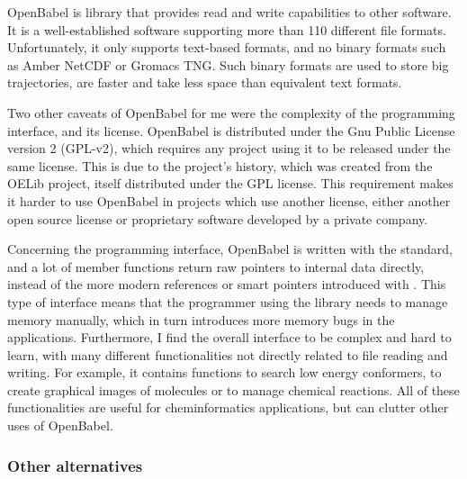 \documentclass[thesis]{subfiles}
\begin{document}
OpenBabel\cite{OBoyle2011} is \cxx library that provides read and write
capabilities to other software. It is a well-established software supporting
more than 110 different file formats. Unfortunately, it only supports text-based
formats, and no binary formats such as Amber NetCDF or Gromacs TNG. Such binary
formats are used to store big trajectories, are faster and take less space than
equivalent text formats.

Two other caveats of OpenBabel for me were the complexity of the programming
interface, and its license. OpenBabel is distributed under the Gnu Public
License version 2 (GPL-v2), which requires any project using it to be released
under the same license. This is due to the project's history, which was created
from the OELib project, itself distributed under the GPL license. This
requirement makes it harder to use OpenBabel in projects which use another
license, either another open source license or proprietary software developed by
a private company.

Concerning the programming interface, OpenBabel is written with the 
standard, and a lot of member functions return raw pointers to internal data
directly, instead of the more modern references or smart pointers introduced
with . This type of interface means that the programmer using the library
needs to manage memory manually, which in turn introduces more memory bugs in
the applications. Furthermore, I find the overall interface to be complex and
hard to learn, with many different functionalities not directly related to file
reading and writing. For example, it contains functions to search low energy
conformers, to create graphical images of molecules or to manage chemical
reactions. All of these functionalities are useful for cheminformatics
applications, but can clutter other uses of OpenBabel.

\subsubsection{Other alternatives}
\end{document}
